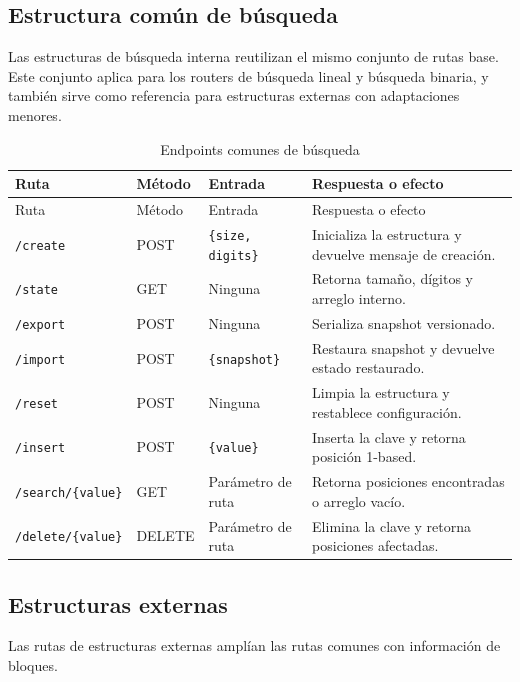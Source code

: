 \documentclass[12pt,onecolumn]{IEEEtran}
\begin{document}
\subsection{Estructura común de búsqueda}
Las estructuras de búsqueda interna reutilizan el mismo conjunto de rutas base. Este conjunto aplica para los routers de búsqueda lineal y búsqueda binaria, y también sirve como referencia para estructuras externas con adaptaciones menores.

\begin{longtable}{>{\raggedright\arraybackslash}p{3.2cm}p{2.4cm}p{4.1cm}p{5.0cm}}
\caption{Endpoints comunes de búsqueda}\label{tab:endpoints-search}\\
\toprule
Ruta & Método & Entrada & Respuesta o efecto \\
\midrule
\endfirsthead
\toprule
Ruta & Método & Entrada & Respuesta o efecto \\
\midrule
\endhead
\texttt{/create} & POST & \texttt{\{size, digits\}} & Inicializa la estructura y devuelve mensaje de creación. \\
\texttt{/state} & GET & Ninguna & Retorna tamaño, dígitos y arreglo interno. \\
\texttt{/export} & POST & Ninguna & Serializa snapshot versionado. \\
\texttt{/import} & POST & \texttt{\{snapshot\}} & Restaura snapshot y devuelve estado restaurado. \\
\texttt{/reset} & POST & Ninguna & Limpia la estructura y restablece configuración. \\
\texttt{/insert} & POST & \texttt{\{value\}} & Inserta la clave y retorna posición 1-based. \\
\texttt{/search/\{value\}} & GET & Parámetro de ruta & Retorna posiciones encontradas o arreglo vacío. \\
\texttt{/delete/\{value\}} & DELETE & Parámetro de ruta & Elimina la clave y retorna posiciones afectadas. \\
\bottomrule
\end{longtable}

\subsection{Estructuras externas}
Las rutas de estructuras externas amplían las rutas comunes con información de bloques.
\end{document}

